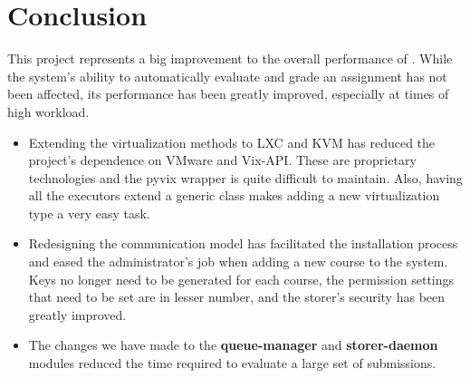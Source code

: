 \chapter{Conclusion}
\label{chapter:virt-concl}

This project represents a big improvement to the overall performance of \project.
While the system's ability to automatically evaluate and grade an assignment
has not been affected, its performance has been greatly improved, 
especially at times of high workload.


\begin{itemize}
\item Extending the virtualization methods to LXC and KVM has reduced the project's 
dependence on VMware and Vix-API. These are proprietary technologies and 
the pyvix wrapper is quite difficult to maintain. Also, having all the
executors extend a generic class makes adding a new virtualization type 
a very easy task.

\item Redesigning the communication model has facilitated the installation process
and eased the administrator's job when adding a new course to the system. 
Keys no longer need to be generated for each course, the permission settings
that need to be set are in lesser number, and the storer's security has been
greatly improved.

\item The changes we have made to the {\bf queue-manager} and
{\bf storer-daemon} modules reduced the time required to evaluate a large
set of submissions. 
\end{itemize}
